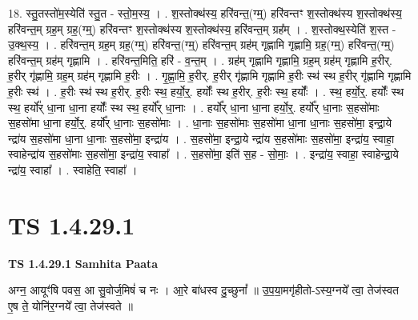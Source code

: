 \documentclass[17pt]{extarticle}
\begin{document}
18. स्तु॒तस्तो॑म॒स्येति॑ स्तु॒त - स्तो॒म॒स्य॒ । . श॒स्तोक्थ॑स्य॒ हरि॑वन्त॒(ग्म्॒) हरि॑वन्तꣳ श॒स्तोक्थ॑स्य श॒स्तोक्थ॑स्य॒ हरि॑वन्त॒म् ग्रह॒म् ग्रह॒(ग्म्॒) हरि॑वन्तꣳ श॒स्तोक्थ॑स्य श॒स्तोक्थ॑स्य॒ हरि॑वन्त॒म् ग्रह᳚म् । . श॒स्तोक्थ॒स्येति॑ श॒स्त - उ॒क्थ॒स्य॒ । . हरि॑वन्त॒म् ग्रह॒म् ग्रह॒(ग्म्॒) हरि॑वन्त॒(ग्म्॒) हरि॑वन्त॒म् ग्रह॑म् गृह्णामि गृह्णामि॒ ग्रह॒(ग्म्॒) हरि॑वन्त॒(ग्म्॒) हरि॑वन्त॒म् ग्रह॑म् गृह्णामि । . हरि॑वन्त॒मिति॒ हरि॑ - व॒न्त॒म् । . ग्रह॑म् गृह्णामि गृह्णामि॒ ग्रह॒म् ग्रह॑म् गृह्णामि ह॒रीर्. ह॒रीर् गृ॑ह्णामि॒ ग्रह॒म् ग्रह॑म् गृह्णामि ह॒रीः । . गृ॒ह्णा॒मि॒ ह॒रीर्. ह॒रीर् गृ॑ह्णामि गृह्णामि ह॒रीः स्थ॑ स्थ ह॒रीर् गृ॑ह्णामि गृह्णामि ह॒रीः स्थ॑ । . ह॒रीः स्थ॑ स्थ ह॒रीर्. ह॒रीः स्थ॒ हर्यो॒र्॒. हर्योः᳚ स्थ ह॒रीर्. ह॒रीः स्थ॒ हर्योः᳚ । . स्थ॒ हर्यो॒र्॒. हर्योः᳚ स्थ स्थ॒ हर्यो᳚र् धा॒ना धा॒ना हर्योः᳚ स्थ स्थ॒ हर्यो᳚र् धा॒नाः । . हर्यो᳚र् धा॒ना धा॒ना हर्यो॒र्॒. हर्यो᳚र् धा॒नाः स॒हसो॑माः स॒हसो॑मा धा॒ना हर्यो॒र्॒. हर्यो᳚र् धा॒नाः स॒हसो॑माः । . धा॒नाः स॒हसो॑माः स॒हसो॑मा धा॒ना धा॒नाः स॒हसो॑मा॒ इन्द्रा॒ये न्द्रा॑य स॒हसो॑मा धा॒ना धा॒नाः स॒हसो॑मा॒ इन्द्रा॑य । . स॒हसो॑मा॒ इन्द्रा॒ये न्द्रा॑य स॒हसो॑माः स॒हसो॑मा॒ इन्द्रा॑य॒ स्वाहा॒ स्वाहेन्द्रा॑य स॒हसो॑माः स॒हसो॑मा॒ इन्द्रा॑य॒ स्वाहा᳚ । . स॒हसो॑मा॒ इति॑ स॒ह - सो॒माः॒ । . इन्द्रा॑य॒ स्वाहा॒ स्वाहेन्द्रा॒ये न्द्रा॑य॒ स्वाहा᳚ । . स्वाहेति॒ स्वाहा᳚ । \newline
\pagebreak
{}
\section*{ TS 1.4.29.1 }

\textbf{TS 1.4.29.1 } \newline
\textbf{Samhita Paata} \newline

अग्न॒ आयूꣳ॑षि पवस॒ आ सु॒वोर्ज॒मिषं॑ च नः । आ॒रे बा॑धस्व दु॒च्छुनां᳚ ॥ उ॒प॒या॒मगृ॑हीतो-ऽस्य॒ग्नये᳚ त्वा॒ तेज॑स्वत ए॒ष ते॒ योनि॑र॒ग्नये᳚ त्वा॒ तेज॑स्वते ॥ \newline
\end{document}

